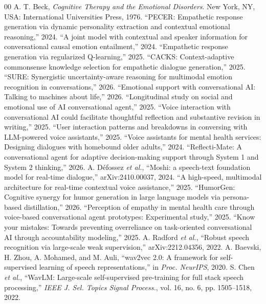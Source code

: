 \documentclass[conference]{IEEEtran}
\begin{document}
\begin{thebibliography}{00}
 A. T. Beck, \textit{Cognitive Therapy and the Emotional Disorders}. New York, NY, USA: International Universities Press, 1976.
 ``PECER: Empathetic response generation via dynamic personality extraction and contextual emotional reasoning,'' 2024.
 ``A joint model with contextual and speaker information for conversational causal emotion entailment,'' 2024.
 ``Empathetic response generation via regularized Q-learning,'' 2025.
 ``CACKS: Context-adaptive commonsense knowledge selection for empathetic dialogue generation,'' 2025.
 ``SURE: Synergistic uncertainty-aware reasoning for multimodal emotion recognition in conversations,'' 2026.
 ``Emotional support with conversational AI: Talking to machines about life,'' 2026.
 ``Longitudinal study on social and emotional use of AI conversational agent,'' 2025.
 ``Voice interaction with conversational AI could facilitate thoughtful reflection and substantive revision in writing,'' 2025.
 ``User interaction patterns and breakdowns in conversing with LLM-powered voice assistants,'' 2025.
 ``Voice assistants for mental health services: Designing dialogues with homebound older adults,'' 2024.
 ``Reflecti-Mate: A conversational agent for adaptive decision-making support through System 1 and System 2 thinking,'' 2026.
 A. D\'efossez \textit{et al.}, ``Moshi: a speech-text foundation model for real-time dialogue,'' arXiv:2410.00037, 2024.
 ``A high-speed, multimodal architecture for real-time contextual voice assistance,'' 2025.
 ``HumorGen: Cognitive synergy for humor generation in large language models via persona-based distillation,'' 2026.
 ``Perception of empathy in mental health care through voice-based conversational agent prototypes: Experimental study,'' 2025.
 ``Know your mistakes: Towards preventing overreliance on task-oriented conversational AI through accountability modeling,'' 2025.
 A. Radford \textit{et al.}, ``Robust speech recognition via large-scale weak supervision,'' arXiv:2212.04356, 2022.
 A. Baevski, H. Zhou, A. Mohamed, and M. Auli, ``wav2vec 2.0: A framework for self-supervised learning of speech representations,'' in \textit{Proc. NeurIPS}, 2020.
 S. Chen \textit{et al.}, ``WavLM: Large-scale self-supervised pre-training for full stack speech processing,'' \textit{IEEE J. Sel. Topics Signal Process.}, vol. 16, no. 6, pp. 1505--1518, 2022.

\end{thebibliography}
\end{document}
